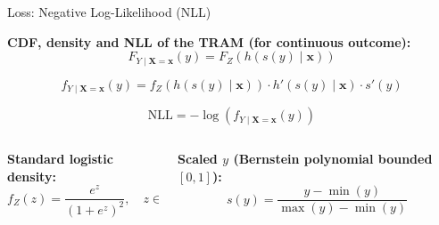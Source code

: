\documentclass[onlytextwidth,english]{beamer}\usepackage[]{graphicx}\usepackage[]{xcolor}
\begin{document}
\begin{frame}{Loss: Negative Log-Likelihood (NLL)}

\textbf{CDF, density and NLL of the TRAM (for continuous outcome):}
\[
F_{Y \mid \mathbf{X} = \mathbf{x}}(y) = F_Z(h(s(y) \mid \mathbf{x}))
\]

\[
f_{Y \mid \mathbf{X} = \mathbf{x}}(y) = f_Z(h(s(y) \mid \mathbf{x})) \cdot h'(s(y) \mid \mathbf{x}) \cdot s'(y)
\]


\[
\text{NLL} = - \log (f_{Y \mid \mathbf{X} = \mathbf{x}}(y))
\]


\vspace{0.4cm}

\begin{columns}
\begin{column}{0.5\textwidth}
{\scriptsize
\textbf{Standard logistic density:}
\[
f_Z(z) = \frac{e^{z}}{(1 + e^{z})^2}, \quad z \in \mathbb{R}
\]
}
\end{column}

\begin{column}{0.5\textwidth}
{\scriptsize
\textbf{Scaled $y$ (Bernstein polynomial bounded $[0,1]$):}
\[
s(y) = \frac{y - \min(y)}{\max(y) - \min(y)}
\]
}
\end{column}
\end{columns}

\end{frame}
\end{document}
